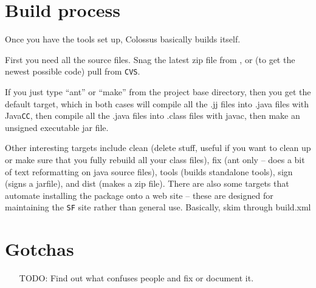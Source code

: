 \documentclass{article}
\begin{document}
\section{Build process}

Once you have the tools set up, Colossus basically builds itself.

First you need all the source files. Snag the latest zip file from 
, or (to get
the newest possible code) pull from \texttt{CVS}.

If you just type ``ant'' or ``make'' from the project base directory,
then you get the default target, which in both cases will compile
all the .jj files into .java files with Java\texttt{CC}, then compile all
the .java files into .class files with javac, then make an unsigned
executable jar file.

Other interesting targets include clean (delete stuff, useful if
you want to clean up or make sure that you fully rebuild all your
class files), fix (ant only -- does a bit of text reformatting on
java source files), tools (builds standalone tools), sign (signs
a jarfile), and dist (makes a zip file). There are also some
targets that automate installing the package onto a web site --
these are designed for maintaining the \texttt{SF} site rather than general
use. Basically, skim through build.xml

\section{Gotchas}

\begin{itemize}
\item[TODO:] Find out what confuses people and fix or document it.
\end{itemize}



\end{document}
